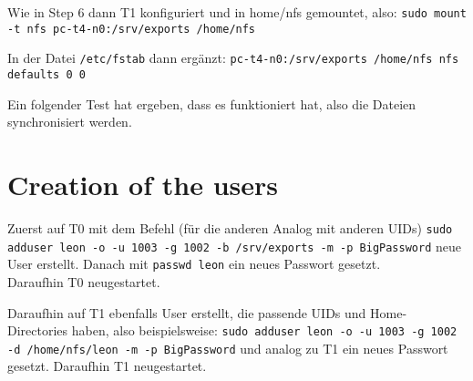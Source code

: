 \documentclass[a4paper,12pt,DIV=15, ngerman, parskip=half]{scrartcl}  %
\numberwithin{equation}{section}
\begin{document}
Wie in Step 6 dann T1 konfiguriert und in home/nfs gemountet, also: \texttt{sudo mount -t nfs pc-t4-n0:/srv/exports  /home/nfs}

In der Datei \texttt{/etc/fstab} dann ergänzt: \texttt{pc-t4-n0:/srv/exports /home/nfs nfs defaults 0 0}

Ein folgender Test hat ergeben, dass es funktioniert hat, also die Dateien synchronisiert werden.


\section{Creation of the users}
\label{sec:creation-users}

Zuerst auf T0 mit dem Befehl (für die anderen Analog mit anderen UIDs) \texttt{sudo adduser leon -o -u 1003 -g 1002 -b /srv/exports -m -p BigPassword} neue User erstellt. Danach mit \texttt{passwd leon} ein neues Passwort gesetzt. \\
Daraufhin T0 neugestartet.


Daraufhin auf T1 ebenfalls User erstellt, die passende UIDs und Home-Directories haben, also beispielsweise: \texttt{sudo adduser leon -o -u 1003 -g 1002 -d /home/nfs/leon -m -p BigPassword} und analog zu T1 ein neues Passwort gesetzt.
Daraufhin T1 neugestartet.










\end{document}
